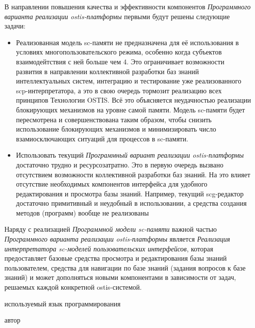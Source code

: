 В направлении повышения качества и эффективности компонентов \textit{Программного варианта реализации ostis-платформы} первыми будут решены следующие задачи:
\begin{itemize}
    \item Реализованная модель sc-памяти не предназначена для её использования в условиях многопользовательского режима, особенно когда субъектов взаимодейтствия с ней больше чем 4. Это ограничивает возможности развития в направлении коллективной разработки баз знаний интеллектуальных систем, интеграцию и тестирование уже реализованного scp-интерпретатора, а это в свою очередь тормозит реализацию всех принципов Технологии OSTIS. Всё это объясняется неудачностью реализации блокирующих механизмов на уровне самой памяти. Модель sc-памяти будет пересмотрена и совершенствована таким образом, чтобы снизить использование блокирующих механизмов и минимизировать число взамиосключающих ситуаций для процессов в sc-памяти.
    \item Использовать текущий \textit{Программный вариант реализации ostis-платформы} достаточно трудно и ресурсозатратно. Это в первую очередь вызвано отсутствием возможности коллективной разработки баз знаний. На это влияет отсутствие необходимых компонентов интерфейса для удобного редактирования и просмотра базы знаний. Например, текущий scg-редактор достаточно примитивный и неудобный в использовании, а средства создания методов (программ) вообще не реализованы
\end{itemize}

Наряду с реализацией \textit{Программной модели sc-памяти} важной частью \textit{Программного варианта реализации
ostis-платформы} является \textit{Реализация интерпретатора sc-моделей пользовательских интерфейсов}, которая
предоставляет базовые средства просмотра и редактирования базы знаний пользователем, средства для навигации по базе знаний
(задания вопросов к базе знаний) и может дополняться новыми компонентами в зависимости от задач, решаемых каждой
конкретной ostis-системой.

\begin{SCn}
\begin{scnrelfromlist}{используемый язык программирования}
\end{scnrelfromlist}
\begin{scnrelfromlist}{автор}
\end{scnrelfromlist}
\end{SCn}

